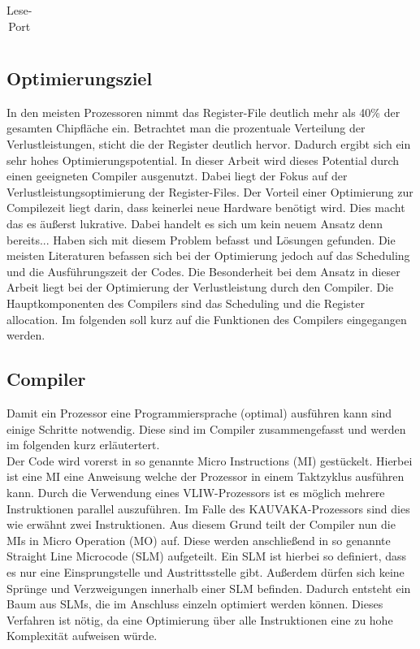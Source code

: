 \begin{table}[htbp]
\begin{minipage}{.5\textwidth}
\begin{tabular}{cccccccccccccccccc}
		\end{tabular}
		\caption{\label{lese-port}Lese-Port}
	\end{minipage}
\end{table}


\newpage
\subsection{Optimierungsziel}
In den meisten Prozessoren nimmt das Register-File deutlich mehr als 40\% der gesamten Chipfläche ein. 
Betrachtet man die prozentuale Verteilung der Verlustleistungen, sticht die der Register deutlich hervor. Dadurch ergibt sich ein sehr hohes Optimierungspotential. In dieser Arbeit wird dieses Potential durch einen geeigneten Compiler ausgenutzt. Dabei liegt der Fokus auf der Verlustleistungsoptimierung der Register-Files. Der Vorteil einer Optimierung zur Compilezeit liegt darin, dass keinerlei neue Hardware benötigt wird. Dies macht das es äußerst lukrative. Dabei handelt es sich um kein neuem Ansatz denn bereits...  Haben sich mit diesem Problem befasst und Lösungen gefunden. Die meisten Literaturen befassen sich bei der Optimierung jedoch auf das Scheduling und die Ausführungszeit der Codes. Die Besonderheit bei dem Ansatz in dieser Arbeit liegt bei der Optimierung der Verlustleistung durch den Compiler. Die Hauptkomponenten des Compilers sind das Scheduling und die Register allocation. Im folgenden soll kurz auf die Funktionen des Compilers eingegangen werden. 
\subsection{Compiler}

Damit ein Prozessor eine Programmiersprache (optimal) ausführen kann sind einige Schritte notwendig. Diese sind im Compiler zusammengefasst und werden im folgenden kurz erläutertert.\\
Der Code wird vorerst in so genannte Micro Instructions (MI) gestückelt.  Hierbei ist eine MI eine Anweisung welche der Prozessor in einem Taktzyklus ausführen kann. Durch die Verwendung eines VLIW-Prozessors ist es möglich mehrere Instruktionen parallel auszuführen. Im Falle des KAUVAKA-Prozessors sind dies wie erwähnt zwei Instruktionen. Aus diesem Grund teilt der Compiler nun die MIs in Micro Operation (MO) auf. Diese werden anschließend in so genannte \glqq Straight Line Microcode\grqq{} (SLM) aufgeteilt. Ein SLM ist hierbei so definiert, dass es nur eine Einsprungstelle und Austrittsstelle gibt. Außerdem dürfen sich keine Sprünge und Verzweigungen innerhalb einer SLM befinden.  Dadurch entsteht ein Baum aus SLMs, die im Anschluss einzeln optimiert werden können. Dieses Verfahren ist nötig, da eine Optimierung über alle Instruktionen eine zu hohe Komplexität aufweisen würde. \cite{landskov1980local}
